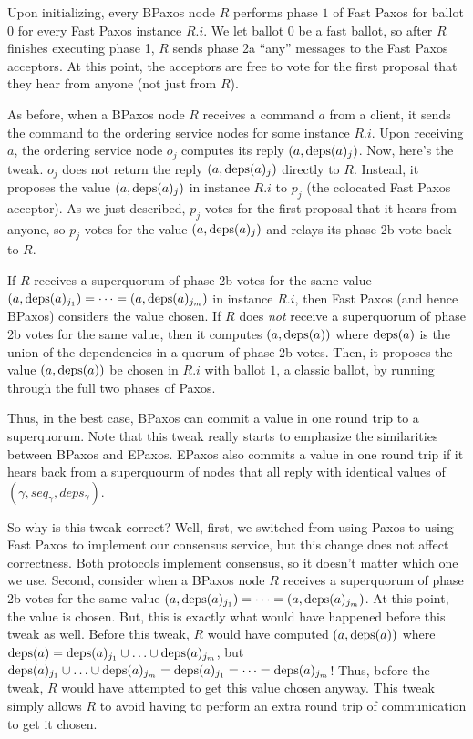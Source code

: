 \documentclass{mwhittaker}
\begin{document}
Upon initializing, every BPaxos node $R$ performs phase $1$ of Fast Paxos for
ballot $0$ for every Fast Paxos instance $R.i$. We let ballot $0$ be a fast
ballot, so after $R$ finishes executing phase 1, $R$ sends phase 2a ``any''
messages to the Fast Paxos acceptors. At this point, the acceptors are free to
vote for the first proposal that they hear from anyone (not just from $R$).

As before, when a BPaxos node $R$ receives a command $a$ from a client, it
sends the command to the ordering service nodes for some instance $R.i$.
Upon receiving $a$, the ordering service node $o_j$ computes its reply $(a,
\text{deps}(a)_j)$. Now, here's the tweak. $o_j$ does not return the reply $(a,
\text{deps}(a)_j)$ directly to $R$. Instead, it proposes the value $(a, \text{deps}(a)_j)$
in instance $R.i$ to $p_j$ (the colocated Fast Paxos acceptor). As we just
described, $p_j$ votes for the first proposal that it hears from anyone, so
$p_j$ votes for the value $(a, \text{deps}(a)_j)$ and relays its phase 2b vote back
to $R$.

If $R$ receives a superquorum of phase 2b votes for the same value $(a,
\text{deps}(a)_{j_1}) = \cdots = (a, \text{deps}(a)_{j_{m}})$ in instance $R.i$, then Fast
Paxos (and hence BPaxos) considers the value chosen. If $R$ does \emph{not}
receive a superquorum of phase 2b votes for the same value, then it computes
$(a, \text{deps}(a))$ where $\text{deps}(a)$ is the union of the dependencies in a quorum
of phase 2b votes. Then, it proposes the value $(a, \text{deps}(a))$ be chosen in
$R.i$ with ballot $1$, a classic ballot, by running through the full two phases
of Paxos.

Thus, in the best case, BPaxos can commit a value in one round trip to a
superquorum. Note that this tweak really starts to emphasize the similarities
between BPaxos and EPaxos. EPaxos also commits a value in one round trip if it
hears back from a superquourm of nodes that all reply with identical values of
$(\gamma, seq_\gamma, deps_\gamma)$.

So why is this tweak correct? Well, first, we switched from using Paxos to
using Fast Paxos to implement our consensus service, but this change does not
affect correctness. Both protocols implement consensus, so it doesn't matter
which one we use. Second, consider when a BPaxos node $R$ receives a
superquorum of phase 2b votes for the same value $(a, \text{deps}(a)_{j_1}) = \cdots
= (a, \text{deps}(a)_{j_{m}})$. At this point, the value is chosen. But, this is
exactly what would have happened before this tweak as well. Before this tweak,
$R$ would have computed $(a, \text{deps}(a))$ where $\text{deps}(a) = \text{deps}(a)_{j_1} \cup
\ldots \cup \text{deps}(a)_{j_{m}}$, but $\text{deps}(a)_{j_1} \cup \ldots \cup
\text{deps}(a)_{j_{m}} = \text{deps}(a)_{j_1} = \cdots = \text{deps}(a)_{j_m}$! Thus, before the
tweak, $R$ would have attempted to get this value chosen anyway. This tweak
simply allows $R$ to avoid having to perform an extra round trip of
communication to get it chosen.
\end{document}
